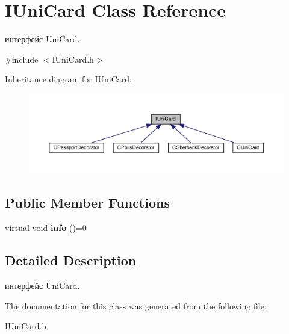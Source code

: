 \hypertarget{classIUniCard}{}\section{I\+Uni\+Card Class Reference}
\label{classIUniCard}


интерфейс Uni\+Card.  




{\ttfamily \#include $<$I\+Uni\+Card.\+h$>$}



Inheritance diagram for I\+Uni\+Card\+:\nopagebreak
\begin{figure}[H]
\begin{center}
\leavevmode
\includegraphics[width=350pt]{classIUniCard__inherit__graph}
\end{center}
\end{figure}
\subsection*{Public Member Functions}
\begin{DoxyCompactItemize}
\item 
\mbox{\label{classIUniCard_ae2f691f3ca5879965692d9061f88c423}} 
virtual void {\bfseries info} ()=0
\end{DoxyCompactItemize}


\subsection{Detailed Description}
интерфейс Uni\+Card. 

The documentation for this class was generated from the following file\+:\begin{DoxyCompactItemize}
\item 
I\+Uni\+Card.\+h\end{DoxyCompactItemize}
